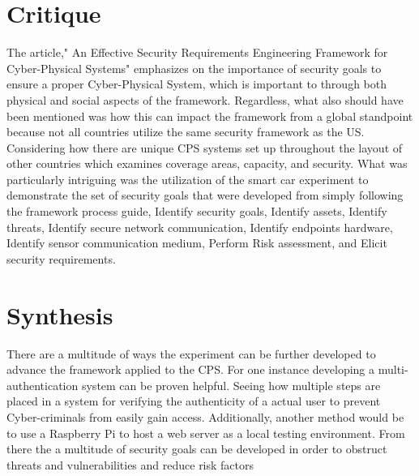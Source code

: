 \documentclass[twoside]{article}
\begin{document}
\section{Critique}
The article," An Effective Security Requirements Engineering
Framework for Cyber-Physical Systems" emphasizes on the importance of security goals to ensure a proper Cyber-Physical System, which is important to through both physical and social aspects of the framework. Regardless, what also should have been mentioned was how this can impact the framework from a global standpoint because not all countries utilize the same security framework as the US. Considering  how there are unique CPS systems set up throughout the layout of other countries which examines coverage areas, capacity, and security. What was particularly intriguing was the utilization of the smart car experiment to demonstrate the set of security goals that were developed from simply following the framework process guide, Identify security goals, Identify assets, Identify threats, Identify secure network communication, Identify endpoints hardware, Identify sensor communication medium, Perform Risk
assessment, and Elicit security requirements\cite{Rehman}.


\section{Synthesis}

There are a multitude of ways the experiment can be further developed to advance the framework applied to the CPS. For one instance developing a multi-authentication system can be proven helpful. Seeing how multiple steps are placed in a system for verifying the authenticity of a actual user to prevent Cyber-criminals from easily gain access. Additionally, another method would be to use a Raspberry Pi to host a web server as a local testing environment. From there the a multitude of security goals can be developed in order to obstruct threats and vulnerabilities and reduce risk factors \cite{Rehman} 



\end{document}
